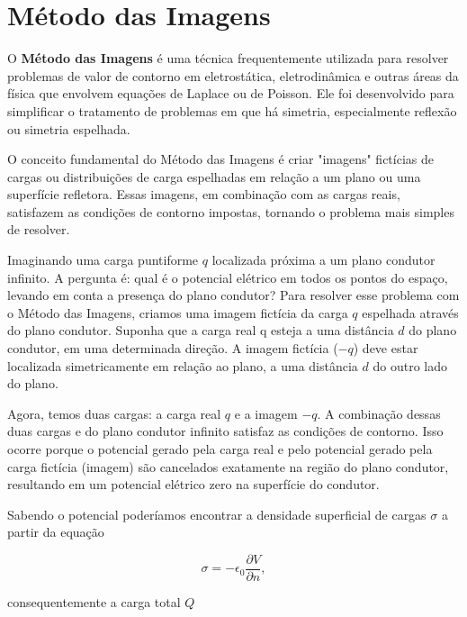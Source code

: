 \newpage\section{Método das Imagens} O \textbf{Método das Imagens} é uma técnica frequentemente utilizada para resolver problemas de valor de contorno em eletrostática, eletrodinâmica e outras áreas da física que envolvem equações de Laplace ou de Poisson. Ele foi desenvolvido para simplificar o tratamento de problemas em que há simetria, especialmente reflexão ou simetria espelhada.

O conceito fundamental do Método das Imagens é criar "imagens" fictícias de cargas ou distribuições de carga espelhadas em relação a um plano ou uma superfície refletora. Essas imagens, em combinação com as cargas reais, satisfazem as condições de contorno impostas, tornando o problema mais simples de resolver.


Imaginando uma carga puntiforme $q$ localizada próxima a um plano condutor infinito. A pergunta é: qual é o potencial elétrico em todos os pontos do espaço, levando em conta a presença do plano condutor? Para resolver esse problema com o Método das Imagens, criamos uma imagem fictícia da carga $q$ espelhada através do plano condutor. Suponha que a carga real q esteja a uma distância $d$ do plano condutor, em uma determinada direção. A imagem fictícia ($-q$) deve estar localizada simetricamente em relação ao plano, a uma distância $d$ do outro lado do plano.

Agora, temos duas cargas: a carga real $q$ e a imagem $-q$. A combinação dessas duas cargas e do plano condutor infinito satisfaz as condições de contorno. Isso ocorre porque o potencial gerado pela carga real e pelo potencial gerado pela carga fictícia (imagem) são cancelados exatamente na região do plano condutor, resultando em um potencial elétrico zero na superfície do condutor.

Sabendo o potencial poderíamos encontrar a densidade superficial de cargas $\sigma$ a partir da equação 

\begin{equation}
    \sigma = -\epsilon_{0} \frac{\partial V}{\partial n},
\end{equation}

consequentemente a carga total $Q$

